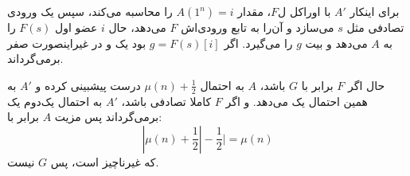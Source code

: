 \documentclass[12pt]{article}
\begin{document}
برای اینکار $A'$ با اوراکل ل$F$، مقدار $A(1^n) = i$ را محاسبه می‌کند، سپس یک ورودی تصادفی مثل $s$ می‌سازد و آن‌را به تابع ورودی‌اش $F$ می‌دهد، حال $i$ عضو اول $F(s)$ را به $A$ می‌دهد و بیت $g$ را می‌گیرد. اگر $g = F(s)[i]$ بود یک و در غیراینصورت صفر برمی‌گرداند.

حال اگر $F$ برابر با $G$ باشد، $A$ به احتمال $\mu(n) + \frac{1}{2}$ درست پیشبینی کرده و $A'$ به همین احتمال یک می‌دهد. و اگر $F$ کاملا تصادفی باشد، $A'$ به احتمال یک‌دوم یک برمی‌گرداند پس مزیت $A$  برابر با:
$$
| \mu(n) + \frac{1}{2} | - \frac{1}{2}| = \mu(n)
$$
که غیرناچیز است، پس $G$  نیست.
\end{document}
